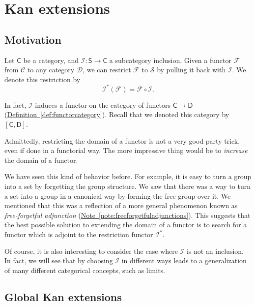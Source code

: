 \documentclass[notes.tex]{subfiles}
\begin{document}
\chapter{Kan extensions}\label{sec:kan_extensions}

\section{Motivation}
\label{sec:motivation}

Let $\mathsf{C}$ be a category, and $\mathcal{I}\colon \mathsf{S} \to \mathsf{C}$ a subcategory inclusion. Given a functor $\mathcal{F}$ from $\mathcal{C}$ to any category $\mathcal{D}$, we can restrict $\mathcal{F}$ to $\mathcal{S}$ by pulling it back with $\mathcal{I}$. We denote this restriction by
\begin{equation*}
  \mathcal{I}^{*}(\mathcal{F}) = \mathcal{F} \circ \mathcal{I}.
\end{equation*}

In fact, $\mathcal{I}$ induces a functor on the category of functors $\mathsf{C} \to \mathsf{D}$ (\hyperref[def:functorcategory]{Definition~\ref*{def:functorcategory}}). Recall that we denoted this category by $[\mathsf{C}, \mathsf{D}]$. 

Admittedly, restricting the domain of a functor is not a very good party trick, even if done in a functorial way. The more impressive thing would be to \emph{increase} the domain of a functor. 

We have seen this kind of behavior before. For example, it is easy to turn a group into a set by forgetting the group structure. We saw that there was a way to turn a set into a group in a canonical way by forming the free group over it. We mentioned that this was a reflection of a more general phenomenon known as \emph{free-forgetful adjunction} (\hyperref[note:freeforgetfuladjunctions]{Note~\ref*{note:freeforgetfuladjunctions}}). This suggests that the best possible solution to extending the domain of a functor is to search for a functor which is adjoint to the restriction functor $\mathcal{I}^{*}$.

Of course, it is also interesting to consider the case where $\mathcal{I}$ is not an inclusion. In fact, we will see that by choosing $\mathcal{I}$ in different ways leads to a generalization of many different categorical concepts, such as limits.

\section{Global Kan extensions}
\label{sec:global_kan_extensions}
\end{document}
